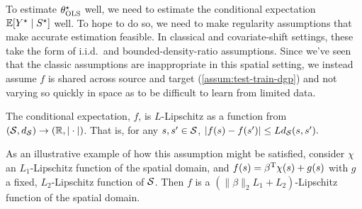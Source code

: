 To estimate $\theta^{\star}_{\text{OLS}}$ well, we need to estimate the conditional expectation $\mathbb{E}[Y^{\star} \mid S^{\star}]$ well. To hope to do so, we need to make regularity assumptions that make accurate estimation feasible. In classical and covariate-shift settings, these take the form of i.i.d.\ and bounded-density-ratio assumptions. Since we've seen that the classic assumptions are inappropriate in this spatial setting, we instead assume $f$ is shared across source and target (\cref{assum:test-train-dgp}) and not varying so quickly in space as to be difficult to learn from limited data.
\begin{assumption}\label{assum:lipschitz}
    The conditional expectation, $f$, is $L$-Lipschitz as a function from $(\mathcal{S}, d_{\mathcal{S}})  \to (\mathbb{R}, |\cdot|)$. That is, for any $s, s' \in \mathcal{S}$,
        $|f(s) - f(s')| \leq L d_{\mathcal{S}}(s,s').$
\end{assumption}
As an illustrative example of how this assumption might be satisfied, consider $\chi$ an $L_1$-Lipschitz function of the spatial domain, and $f(s)=\beta^{\mathrm{T}} \chi(s) + g(s)$ with $g$ a fixed, $L_2$-Lipschitz function of $\mathcal{S}$. Then $f$ is a $(\|\beta\|_2L_1 + L_2)$-Lipschitz function of the spatial domain.

